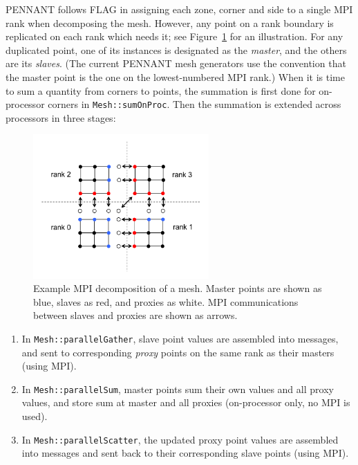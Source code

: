 \documentclass[11pt,letterpaper]{article}
\begin{document}
PENNANT follows FLAG in assigning each zone, corner and side to
a single MPI rank when decomposing the mesh.  However, any point on
a rank boundary is replicated on each rank which needs it; see
Figure~\ref{fig:decomp} for an illustration.  For any duplicated
point, one of its instances is designated as the {\em master}, and
the others are its {\em slaves}.  (The current PENNANT mesh generators
use the convention that the master point is the one on the
lowest-numbered MPI rank.)  When it is time to sum a quantity
from corners to points, the summation is first done for on-processor
corners in {\tt Mesh::sumOnProc}.  Then the summation is extended across
processors in three stages:

\begin{figure}
    \centering
    \includegraphics[width=0.6\textwidth]{domain-decomp.png}
    \caption{Example MPI decomposition of a mesh.  Master points are
        shown as blue, slaves as red, and proxies as white.
        MPI communications between slaves and proxies are shown
        as arrows.}
    \label{fig:decomp}
\end{figure}

\begin{enumerate} \itemsep1pt \parskip0pt
    \item In {\tt Mesh::parallelGather},
        slave point values are assembled into messages, and sent
        to corresponding {\em proxy} points on the same rank as
        their masters (using MPI).
    \item In {\tt Mesh::parallelSum},
        master points sum their own values and all proxy values, and
        store sum at master and all proxies (on-processor only, no MPI
        is used).
    \item In {\tt Mesh::parallelScatter},
        the updated proxy point values are assembled into messages
        and sent back to their corresponding slave points (using MPI).
\end{enumerate}
\end{document}
